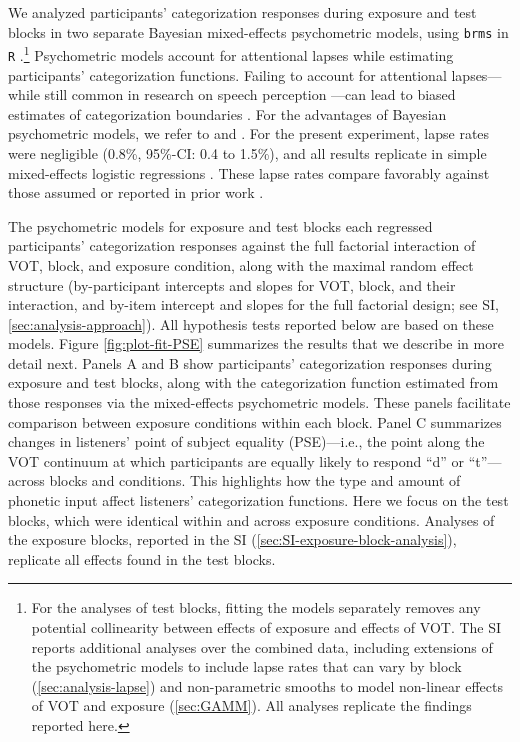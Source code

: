 \documentclass[
  11pt,
  man,mask,floatsintext]{apa6}
\begin{document}
We analyzed participants' categorization responses during exposure and test blocks in two separate Bayesian mixed-effects psychometric models, using \texttt{brms} \autocite{R-brms_a} in \texttt{R} \autocite{R,RStudio}.\footnote{For the analyses of test blocks, fitting the models separately removes any potential collinearity between effects of exposure and effects of VOT. The SI reports additional analyses over the combined data, including extensions of the psychometric models to include lapse rates that can vary by block (\ref{sec:analysis-lapse}) and non-parametric smooths to model non-linear effects of VOT and exposure (\ref{sec:GAMM}). All analyses replicate the findings reported here.} Psychometric models account for attentional lapses while estimating participants' categorization functions. Failing to account for attentional lapses---while still common in research on speech perception \autocites[for exceptions, see][]{clayards2008,kleinschmidt-jaeger2016}---can lead to biased estimates of categorization boundaries \autocite{prins2011,wichmann-hill2001}. For the advantages of Bayesian psychometric models, we refer to \textcite{kuss2005} and \textcite{prins2019}. For the present experiment, lapse rates were negligible (0.8\%, 95\%-CI: 0.4 to 1.5\%), and all results replicate in simple mixed-effects logistic regressions \autocite{jaeger2008}. These lapse rates compare favorably against those assumed or reported in prior work \autocites[e.g.,][]{clayards2008,kleinschmidt-jaeger2016,kleinschmidt2020}.

The psychometric models for exposure and test blocks each regressed participants' categorization responses against the full factorial interaction of VOT, block, and exposure condition, along with the maximal random effect structure (by-participant intercepts and slopes for VOT, block, and their interaction, and by-item intercept and slopes for the full factorial design; see SI, \ref{sec:analysis-approach}). All hypothesis tests reported below are based on these models. Figure \ref{fig:plot-fit-PSE} summarizes the results that we describe in more detail next. Panels A and B show participants' categorization responses during exposure and test blocks, along with the categorization function estimated from those responses via the mixed-effects psychometric models. These panels facilitate comparison between exposure conditions within each block. Panel C summarizes changes in listeners' point of subject equality (PSE)---i.e., the point along the VOT continuum at which participants are equally likely to respond ``d'' or ``t''---across blocks and conditions. This highlights how the type and amount of phonetic input affect listeners' categorization functions. Here we focus on the test blocks, which were identical within and across exposure conditions. Analyses of the exposure blocks, reported in the SI (\ref{sec:SI-exposure-block-analysis}), replicate all effects found in the test blocks.
\end{document}
